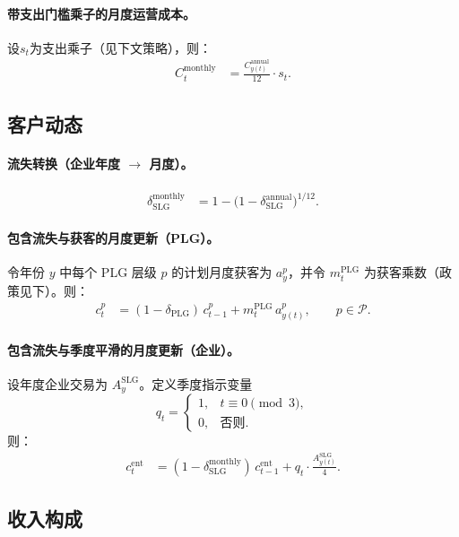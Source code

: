 \documentclass[11pt, a4paper, oneside]{article}
\begin{document}
\paragraph{带支出门槛乘子的月度运营成本。}
设$s_t$为支出乘子（见下文策略），则：
\begin{align}
C^{\mathrm{monthly}}_t 
  &= \frac{C^{\mathrm{annual}}_{y(t)}}{12} \cdot s_t.
\end{align}

\subsection{客户动态}
\paragraph{流失转换（企业年度 $\to$ 月度）。}
\begin{align}
\delta^{\mathrm{monthly}}_{\mathrm{SLG}} 
  &= 1 - \bigl(1 - \delta^{\mathrm{annual}}_{\mathrm{SLG}}\bigr)^{1/12}.
\end{align}

\paragraph{包含流失与获客的月度更新（PLG）。}
令年份 $y$ 中每个 PLG 层级 $p$ 的计划月度获客为 $a^p_y$，并令 $m^{\mathrm{PLG}}_t$ 为获客乘数（政策见下）。则：
\begin{align}
c^p_t 
  &= (1-\delta_{\mathrm{PLG}})\, c^p_{t-1} + m^{\mathrm{PLG}}_t \, a^p_{y(t)}, 
  \qquad p \in \mathcal{P}.
\end{align}

\paragraph{包含流失与季度平滑的月度更新（企业）。}
设年度企业交易为 $A^{\mathrm{SLG}}_{y}$。定义季度指示变量
\[
q_t = 
\begin{cases}
1, & t \equiv 0 \pmod{3},\\
0, & \text{否则}.
\end{cases}
\]
则：
\begin{align}
c^{\mathrm{ent}}_t 
  &= (1-\delta^{\mathrm{monthly}}_{\mathrm{SLG}})\, c^{\mathrm{ent}}_{t-1}
     + q_t \cdot \frac{A^{\mathrm{SLG}}_{y(t)}}{4}.
\end{align}

\subsection{收入构成}
\end{document}
